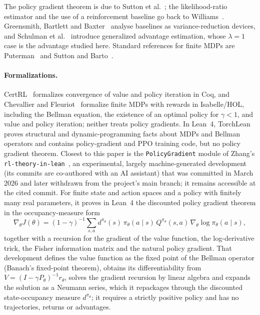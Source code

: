 \documentclass[11pt,a4paper]{article}
\newcommand{\grad}{\nabla_{\theta}}
\begin{document}
The policy gradient theorem is due to Sutton et al.~\cite{sutton2000policy}; the likelihood-ratio estimator and the use of a reinforcement baseline go back to Williams~\cite{williams1992simple}.
Greensmith, Bartlett and Baxter~\cite{greensmith2004variance} analyse baselines as variance-reduction devices, and Schulman et al.~\cite{schulman2016gae} introduce generalized advantage estimation, whose $\lambda=1$ case is the advantage studied here.
Standard references for finite MDPs are Puterman~\cite{puterman1994markov} and Sutton and Barto~\cite{sutton2018reinforcement}.

\paragraph{Formalizations.}
CertRL~\cite{vajjha2021certrl} formalizes convergence of value and policy iteration in Coq, and Chevallier and Fleuriot~\cite{chevallier2021isabelle} formalize finite MDPs with rewards in Isabelle/HOL, including the Bellman equation, the existence of an optimal policy for $\gamma<1$, and value and policy iteration; neither treats policy gradients.
In Lean~4, TorchLean~\cite{torchlean} proves structural and dynamic-programming facts about MDPs and Bellman operators and contains policy-gradient and PPO training code, but no policy gradient theorem.
Closest to this paper is the \texttt{PolicyGradient} module of Zhang's \texttt{rl-theory-in-lean}~\cite{zhang2026pg}, an experimental, largely machine-generated development (its commits are co-authored with an AI assistant) that was committed in March 2026 and later withdrawn from the project's main branch; it remains accessible at the cited commit.
For finite state and action spaces and a policy with finitely many real parameters, it proves in Lean~4 the discounted policy gradient theorem in the occupancy-measure form
\[
\grad J(\theta)=(1-\gamma)^{-1}\sum_{s,a}d^{\pi_\theta}(s)\,\pi_\theta(a\mid s)\,Q^{\pi_\theta}(s,a)\,\grad\log\pi_\theta(a\mid s),
\]
together with a recursion for the gradient of the value function, the log-derivative trick, the Fisher information matrix and the natural policy gradient.
That development defines the value function as the fixed point of the Bellman operator (Banach's fixed-point theorem), obtains its differentiability from $V=(I-\gamma P_\theta)^{-1}r_\theta$, solves the gradient recursion by linear algebra and expands the solution as a Neumann series, which it repackages through the discounted state-occupancy measure $d^{\pi_\theta}$; it requires a strictly positive policy and has no trajectories, returns or advantages.
\end{document}
